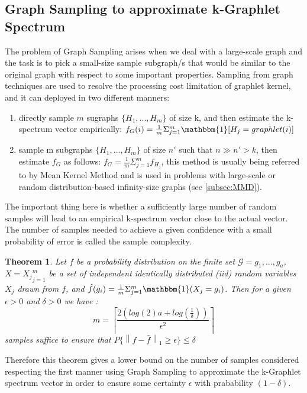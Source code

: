 \subsection{Graph Sampling to approximate k-Graphlet Spectrum}
\label{graph_sampling}
The problem of Graph Sampling arises when we deal with a large-scale graph and the task is to pick a small-size sample subgraph/s that would be similar to the original graph with respect to some important properties.\newline
Sampling from graph techniques are used to resolve the processing cost limitation of graphlet kernel, and it can deployed in two different manners:
\begin{enumerate} \itemsep0pt \parskip0pt 
    \item directly sample $m$ sugraphs $\{H_1,...,H_m\}$ of size k, and then estimate the k-spectrum vector empirically:
    $f_G(i)=\frac{1}{m}\Sigma_{j=1}^m \mathbbm{1}[H_j=graphlet(i)]$
    \item sample m subgraphs  $\{H_1,...,H_m\}$ of size $n'$ such that $n\gg n'>k$, then estimate $f_G$ as follows:
    $f_G=\frac{1}{m}\Sigma_{j=1}^m f_{H_j}$, this method is usually being referred to by Mean Kernel Method and is used in problems with large-scale or random distribution-based infinity-size graphs (see \ref{subsec:MMD}).
\end{enumerate}  
The important thing here is whether a sufficiently large number of random samples will lead to an empirical k-spectrum vector close to the actual vector. The number of samples needed to achieve a given confidence with a small probability of error is called the sample complexity. 
\newtheorem{theorem}{Theorem} 
\begin{theorem}
Let $f$ be a probability distribution on the
finite set $\mathcal{G}={g_1,...,g_a}$, $X={X_j}_{j=1}^m$ be a set of independent identically distributed (iid) random variables $X_j$ drawn from $f$, and $\hat{f}(g_i)=\frac{1}{m}\Sigma_{j=1}^m\mathbbm{1}(X_j=g_i)$. Then for a given $\epsilon>0$ and $\delta >0$ we have \citep{graphlet_kernel}:
\begin{equation}
m=\left \lceil \frac{2(log(2)a+log(\frac{1}{\delta} ))}{\epsilon^2} \right \rceil
\end{equation}
samples suffice to ensure that $P\{\left\| f-\hat{f} \right\|_1 \geq \epsilon \}\leq\delta$
\end{theorem}
Therefore this theorem gives a lower bound on the number of samples considered respecting the first manner using Graph Sampling to approximate the k-Graphlet spectrum vector in order to ensure some certainty $\epsilon$ with prabability $(1-\delta)$.
